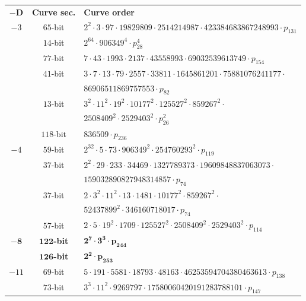 \documentclass[smallextended]{svjour3}
\begin{document}
\begin{table}[!ht]
    \centering%
    \begin{tabularx}{\textwidth}{ccl}                            
        $\mathbf{-D}$    & \textbf{Curve sec.}  & \textbf{Curve order} \\
$-3$ & $65$-bit & $2^{2}  \cdot 3  \cdot 97  \cdot 19829809  \cdot 2514214987  \cdot 423384683867248993  \cdot p_{131}$\\
 & $14$-bit & $2^{64}  \cdot 906349^{4}  \cdot p_{28}^{4}$\\
 & $77$-bit & $7  \cdot 43  \cdot 1993  \cdot 2137  \cdot 43558993  \cdot 69032539613749  \cdot p_{154}$\\
 & $41$-bit & $3  \cdot 7  \cdot 13  \cdot 79  \cdot 2557  \cdot 33811
        \cdot 1645861201  \cdot 75881076241177 \cdot$\\
 &          & $86906511869757553  \cdot p_{82}$\\
 & $13$-bit & $3^{2}  \cdot 11^{2}  \cdot 19^{2}  \cdot 10177^{2}  \cdot 125527^{2}  \cdot 859267^{2}  \cdot$\\
 &          & $2508409^{2}  \cdot 2529403^{2}  \cdot p_{26}^{2}$\\
 & $118$-bit & $836509  \cdot p_{236}$\\
$-4$ & $59$-bit & $2^{32}  \cdot 5  \cdot 73  \cdot 906349^{2}  \cdot 254760293^{2}  \cdot p_{119}$\\
 & $37$-bit & $2^{2}  \cdot 29  \cdot 233  \cdot 34469  \cdot
        1327789373  \cdot 19609848837063073 \cdot$\\
 &          & $159032890827948314857  \cdot p_{74}$\\
 & $37$-bit & $2  \cdot 3^{2}  \cdot 11^{2}  \cdot 13  \cdot 1481  \cdot 10177^{2}  \cdot 859267^{2}  \cdot$\\
 &          & $52437899^{2}  \cdot 346160718017  \cdot p_{74}$\\
 & $57$-bit & $2  \cdot 5  \cdot 19^{2}  \cdot 1709  \cdot 125527^{2}  \cdot 2508409^{2}  \cdot 2529403^{2}  \cdot p_{114}$\\
$\mathbf{-8}$ & $\mathbf{122}$\textbf{-bit} & $\mathbf{2^{7}  \cdot 3^{3}  \cdot p_{244}}$\\
 & $\mathbf{126}$\textbf{-bit} & $\mathbf{2^{2}  \cdot p_{253}}$\\
$-11$ & $69$-bit & $5  \cdot 191  \cdot 5581  \cdot 18793  \cdot 48163  \cdot 46253594704380463613  \cdot p_{138}$\\
 & $73$-bit & $3^{3}  \cdot 11^{2}  \cdot 9269797  \cdot 17580060420191283788101  \cdot p_{147}$\\

\end{tabularx}
\end{table}
\end{document}

